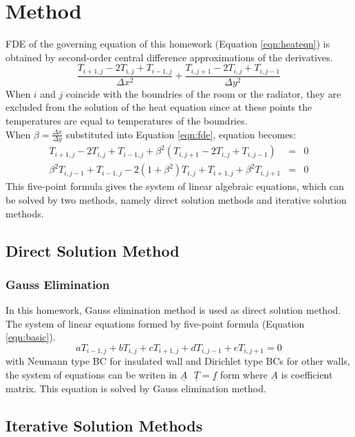 \documentclass[letterpaper,12pt]{article}
\begin{document}
\section{Method}
FDE of the governing equation of this homework (Equation \ref{eqn:heateqn}) is obtained by second-order central difference approximations of the derivatives.
\begin{equation}
	\frac{T_{i+1,j}-2T_{i,j}+T_{i-1,j}}{\Delta x^2}+\frac{T_{i,j+1}-2T_{i,j}+T_{i,j-1}}{\Delta y^2}
	\label{eqn:fde}
\end{equation}
When $i$ and $j$ coincide with the boundries of the room or the radiator, they are excluded
from the solution of the heat equation since at these points the temperatures are equal to
temperatures of the boundries.\\
When $\beta = \frac{\Delta x}{\Delta y}$ substituted into Equation \ref{eqn:fde}, equation becomes:
\begin{eqnarray}
	T_{i+1,j}-2T_{i,j}+T_{i-1,j}+\beta ^2(T_{i,j+1}-2T_{i,j}+T_{i,j-1})&=&0 \nonumber \\
	\beta^2T_{i,j-1}+T_{i-1,j}-2(1+\beta^2)T_{i,j}+T_{i+1,j}+\beta ^2T_{i,j+1}&=&0 
	\label{eqn:basic}
\end{eqnarray}
This five-point formula gives the system of linear algebraic equations, which can be solved by two methods,
namely direct solution methods and iterative solution methods.
\subsection{Direct Solution Method}
\subsubsection{Gauss Elimination}
In this homework, Gauss elimination method is used as direct solution method. The system of linear
equations formed by five-point formula (Equation \ref{eqn:basic}).
\begin{equation}
	aT_{i-1,j}+bT_{i,j}+cT_{i+1,j}+dT_{i,j-1}+eT_{i,j+1}=0
\end{equation}
with Neumann type BC for insulated wall and Dirichlet type BCs for other walls,
the system of equations can be writen in $\underline{A}\mbox{ }\underline{T}=\underline{f}$ form
where $\underline{A}$ is coefficient matrix.
This equation is solved by Gauss elimination method.

\subsection{Iterative Solution Methods}
\end{document}
